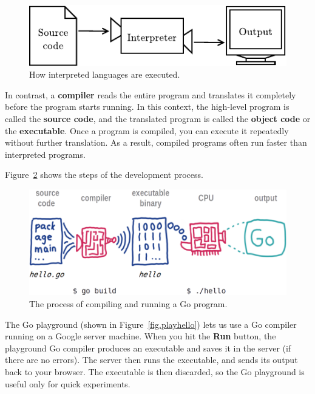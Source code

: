 \begin{figure}[!ht]
\begin{center}
\includegraphics{figs/interpreter.pdf}
\caption{How interpreted languages are executed.}
\label{fig.interpreter}
\end{center}
\end{figure}


In contrast, a {\bf compiler} reads the entire program and translates it completely before the program starts running.
In this context, the high-level program is called the {\bf source code}, and the translated program is called the {\bf object code} or the {\bf executable}.
Once a program is compiled, you can execute it repeatedly without further translation.
As a result, compiled programs often run faster than interpreted programs.

Figure~\ref{fig.compiler} shows the steps of the development process.

\begin{figure}[!ht]
\begin{center}
\includegraphics{figs/compiler.png}
\caption{The process of compiling and running a Go program.}
\label{fig.compiler}
\end{center}
\end{figure}

The Go playground (shown in Figure~\ref{fig.playhello}) lets us use a Go compiler running on a Google server machine.
When you hit the {\bf Run} button, the playground Go compiler produces an executable and saves it in the server (if there are no errors).
The server then runs the executable, and sends its output back to your browser.
The executable is then discarded, so the Go playground is useful only for quick experiments.

